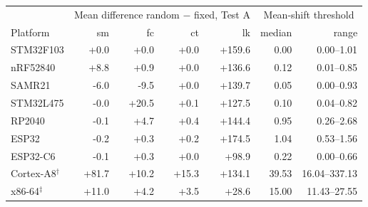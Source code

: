 \begin{tabular}{lrrrrrr}
\hline
 & \multicolumn{4}{c}{Mean difference random $-$ fixed, Test A} & \multicolumn{2}{c}{Mean-shift threshold} \\
Platform & sm & fc & ct & lk & median & range\\
\hline
STM32F103 & +0.0 & +0.0 & +0.0 & +159.6 & 0.00 & 0.00--1.01\\
nRF52840 & +8.8 & +0.9 & +0.0 & +136.6 & 0.12 & 0.01--0.85\\
SAMR21 & -6.0 & -9.5 & +0.0 & +139.7 & 0.05 & 0.00--0.93\\
STM32L475 & -0.0 & +20.5 & +0.1 & +127.5 & 0.10 & 0.04--0.82\\
RP2040 & -0.1 & +4.7 & +0.4 & +144.4 & 0.95 & 0.26--2.68\\
ESP32 & -0.2 & +0.3 & +0.2 & +174.5 & 1.04 & 0.53--1.56\\
ESP32-C6 & -0.1 & +0.3 & +0.0 & +98.9 & 0.22 & 0.00--0.66\\
Cortex-A8$^{\dagger}$ & +81.7 & +10.2 & +15.3 & +134.1 & 39.53 & 16.04--337.13\\
x86-64$^{\ddagger}$ & +11.0 & +4.2 & +3.5 & +28.6 & 15.00 & 11.43--27.55\\
\hline
\end{tabular}
